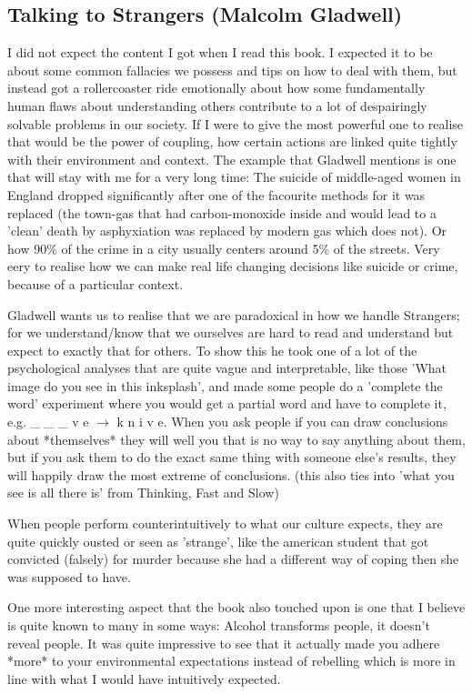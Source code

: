 \subsection{Talking to Strangers (Malcolm Gladwell)}

I did not expect the content I got when I read this book. I expected it to be about some common fallacies we possess and tips on how to deal with them, but instead got a rollercoaster ride emotionally about how some fundamentally human flaws about understanding others contribute to a lot of despairingly solvable problems in our society. 
If I were to give the most powerful one to realise that would be the power of coupling, how certain actions are linked quite tightly with their environment and context. The example that Gladwell mentions is one that will stay with me for a very long time: The suicide of middle-aged women in England dropped significantly after one of the facourite methods for it was replaced (the town-gas that had carbon-monoxide inside and would lead to a 'clean' death by asphyxiation was replaced by modern gas which does not). Or how 90\% of the crime in a city usually centers around 5\% of the streets. Very eery to realise how we can make real life changing decisions like suicide or crime, because of a particular context. 

Gladwell wants us to realise that we are paradoxical in how we handle Strangers; for we understand/know that we ourselves are hard to read and understand but expect to exactly that for others.  To show this he took one of a lot of the psychological analyses that are quite vague and interpretable, like those 'What image do you see in this inksplash', and made some people do a 'complete the word' experiment where you would get a partial word and have to complete it, e.g. \_ \_ \_ v e $ \rightarrow $ k n i v e. When you ask people if you can draw conclusions about *themselves* they will well you that is no way to say anything about them, but if you ask them to do the exact same thing with someone else's results, they will happily draw the most extreme of conclusions. (this also ties into 'what you see is all there is' from Thinking, Fast and Slow)

When people perform counterintuitively to what our culture expects, they are quite quickly ousted or seen as 'strange', like the american student that got convicted (falsely) for murder because she had a different way of coping then she was supposed to have. 

One more interesting aspect that the book also touched upon is one that I believe is quite known to many in some ways: Alcohol transforms people, it doesn't reveal people. It was quite impressive to see that it actually made you adhere *more* to your environmental expectations instead of rebelling which is more in line with what I would have intuitively expected.

